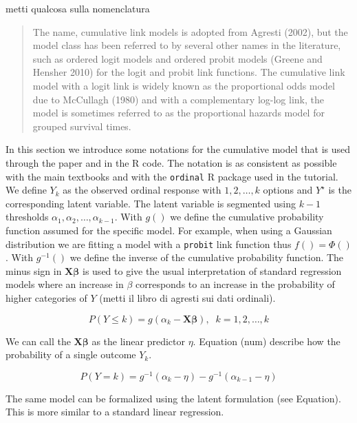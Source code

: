 \documentclass[
  man,floatsintext]{apa6}
\begin{document}
metti qualcosa sulla nomenclatura

\begin{quote}
The name, cumulative link models is adopted from Agresti (2002), but the model class has
been referred to by several other names in the literature, such as ordered logit models and
ordered probit models (Greene and Hensher 2010) for the logit and probit link functions. The
cumulative link model with a logit link is widely known as the proportional odds model due
to McCullagh (1980) and with a complementary log-log link, the model is sometimes referred
to as the proportional hazards model for grouped survival times.
\end{quote}

In this section we introduce some notations for the cumulative model that is used through the paper and in the R code. The notation is as consistent as possible with the main textbooks and with the \texttt{ordinal} R package used in the tutorial. We define \(Y_k\) as the observed ordinal response with \(1, 2, \dots,k\) options and \(Y^\star\) is the corresponding latent variable. The latent variable is segmented using \(k - 1\) thresholds \(\alpha_1, \alpha_2, \dots, \alpha_{k - 1}\). With \(g()\) we define the cumulative probability function assumed for the specific model. For example, when using a Gaussian distribution we are fitting a model with a \texttt{probit} link function thus \(f() = \Phi()\). With \(g^{-1}()\) we define the inverse of the cumulative probability function. The minus sign in \(\mathbf{X}\mathbf{\beta}\) is used to give the usual interpretation of standard regression models where an increase in \(\beta\) corresponds to an increase in the probability of higher categories of \(Y\) (metti il libro di agresti sui dati ordinali).

\begin{equation} 
P(Y \leq k) = g(\alpha_k - \mathbf{X} \mathbf{\beta}), \;\;k = 1, 2, \dots, k
\label{eq:prob-cum-model1}
\end{equation}

We can call the \(\mathbf{X}\mathbf{\beta}\) as the linear predictor \(\eta\). Equation (num) describe how the probability of a single outcome \(Y_k\).

\begin{equation} 
P(Y = k) = g^{-1}(\alpha_k - \eta) -  g^{-1}(\alpha_{k - 1} - \eta)
\label{eq:prob-cum-model2}
\end{equation}

The same model can be formalized using the latent formulation (see Equation). This is more similar to a standard linear regression.
\end{document}
